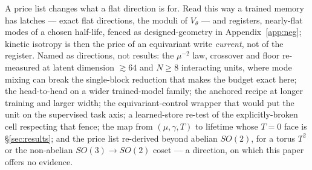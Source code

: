 \documentclass{article}
\begin{document}
A price list changes what a flat direction is for. Read this way a trained memory has latches --- exact flat directions, the moduli of $V_\theta$ --- and registers, nearly-flat modes of a chosen half-life, fenced as designed-geometry in Appendix~\ref{app:neg}; kinetic isotropy is then the price of an equivariant write \emph{current}, not of the register. Named as directions, not results: the $\mu^{-2}$ law, crossover and floor re-measured at latent dimension $\gtrsim64$ and $N\ge8$ interacting units, where mode mixing can break the single-block reduction that makes the budget exact here; the head-to-head on a wider trained-model family; the anchored recipe at longer training and larger width; the equivariant-control wrapper that would put the unit on the supervised task axis; a learned-store re-test of the explicitly-broken cell respecting that fence; the map from $(\mu,\gamma,T)$ to lifetime whose $T=0$ face is \S\ref{sec:results}; and the price list re-derived beyond abelian $SO(2)$, for a torus $T^2$ or the non-abelian $SO(3)\to SO(2)$ coset --- a direction, on which this paper offers no evidence.
\end{document}
